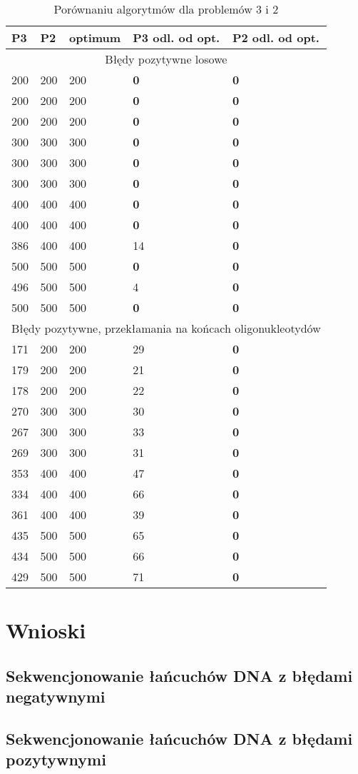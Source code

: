 \documentclass[a4paper]{article}
\begin{document}
\begin{table}[H]
\caption{Porównaniu algorytmów dla problemów 3 i 2}
\begin{tabular}{|p{2cm}|p{2cm}|p{2cm}|p{2cm}|p{2cm}|}
\hline
\multicolumn{1}{|l|}{P3} & \multicolumn{1}{l|}{P2} &
\multicolumn{1}{l|}{optimum} & \multicolumn{1}{l|}{P3 odl. od opt.} &
\multicolumn{1}{l|}{P2 odl. od opt.} \\ \hline
\multicolumn{5}{|c|}{Błędy pozytywne losowe} \\ \hline
200 & 200 & 200 & \textbf{0} & \textbf{0} \\ \hline
200 & 200 & 200 & \textbf{0} & \textbf{0} \\ \hline
200 & 200 & 200 & \textbf{0} & \textbf{0} \\ \hline
300 & 300 & 300 & \textbf{0} & \textbf{0} \\ \hline
300 & 300 & 300 & \textbf{0} & \textbf{0} \\ \hline
300 & 300 & 300 & \textbf{0} & \textbf{0} \\ \hline
400 & 400 & 400 & \textbf{0} & \textbf{0} \\ \hline
400 & 400 & 400 & \textbf{0} & \textbf{0} \\ \hline
386 & 400 & 400 & 14 & \textbf{0} \\ \hline
500 & 500 & 500 & \textbf{0} & \textbf{0} \\ \hline
496 & 500 & 500 & 4 & \textbf{0} \\ \hline
500 & 500 & 500 & \textbf{0} & \textbf{0} \\ \hline
\multicolumn{5}{|c|}{Błędy pozytywne, przekłamania na
końcach oligonukleotydów} \\ \hline
171 & 200 & 200 & 29 & \textbf{0} \\ \hline
179 & 200 & 200 & 21 & \textbf{0} \\ \hline
178 & 200 & 200 & 22 & \textbf{0} \\ \hline
270 & 300 & 300 & 30 & \textbf{0} \\ \hline
267 & 300 & 300 & 33 & \textbf{0} \\ \hline
269 & 300 & 300 & 31 & \textbf{0} \\ \hline
353 & 400 & 400 & 47 & \textbf{0} \\ \hline
334 & 400 & 400 & 66 & \textbf{0} \\ \hline
361 & 400 & 400 & 39 & \textbf{0} \\ \hline
435 & 500 & 500 & 65 & \textbf{0} \\ \hline
434 & 500 & 500 & 66 & \textbf{0} \\ \hline
429 & 500 & 500 & 71 & \textbf{0} \\ \hline
\end{tabular}
\label{}
\end{table}

\section{Wnioski}

\subsection{Sekwencjonowanie łańcuchów DNA z błędami negatywnymi}

\subsection{Sekwencjonowanie łańcuchów DNA z błędami pozytywnymi}
\end{document}

